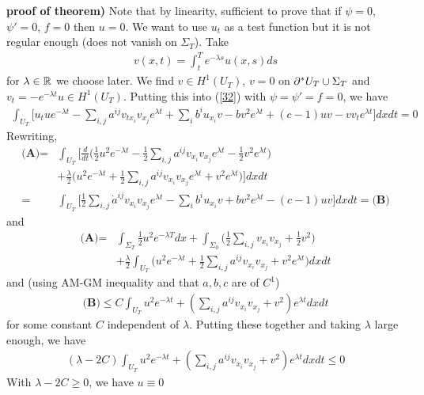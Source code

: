 \documentclass[12pt,a4paper]{report}
\newenvironment{proof}
{\begin{changemargin}{1cm}{0.5cm} 
	}%
	{\end{changemargin}
}
\begin{document}
\begin{proof}
\textbf{proof of theorem)} Note that by linearity, sufficient to prove that if $\psi = 0$, $\psi'=0$, $f=0$ then $u=0$. We want to use $u_t$ as a test function but it is not regular enough (does not vanish on $\Sigma_T$). Take
\begin{align*}
v(x,t) = \int_t^T e^{-\lambda s} u(x,s) ds
\end{align*}
for $\lambda\in \mathbb{R}$ we choose later. We find $v\in H^1(U_T)$, $v=0$ on $\partial^* U_T \cup \Sigma_T$ and $v_t = -e^{-\lambda t} u \in H^1(U_T)$. Putting this into (\ref{32}) with $\psi = \psi' =f=0$, we have
\begin{align*}
\int_{U_T} \Big[ u_t u e^{-\lambda t} - \sum_{i,j} a^{ij} v_{tx_i} v_{x_j} e^{\lambda t} + \sum_{i} b^i u_{x_i} v - bv^2 e^{\lambda t} + (c- 1)uv -   vv_t e^{\lambda t} \Big] dxdt = 0
\end{align*}
Rewriting,
\begin{align*}
\textbf{(A)} =& \int_{U_T} \Big[ \frac{d}{dt} \Big( \frac{1}{2}u^2 e^{-\lambda t} -\frac{1}{2} \sum_{i,j}a^{ij} v_{x_i}v_{x_j} e^{\lambda t} - \frac{1}{2}v^2 e^{\lambda t} \Big) \\
&+ \frac{\lambda}{2} \Big( u^2 e^{-\lambda t} + \frac{1}{2} \sum_{i,j} a^{ij}v_{x_i}v_{x_j} e^{\lambda t} + v^2 e^{\lambda t} \Big) \Big] dxdt \\
=& \int_{U_T} \Big[ \frac{1}{2} \sum_{i,j} \dot{a}^{ij} v_{x_i}v_{x_j} e^{\lambda t} - \sum_{i} b^i u_{x_i} v + bv^2 e^{\lambda t} -(c-1)uv \Big] dxdt = \textbf{(B)}
\end{align*}
and
\begin{align*}
\textbf{(A)} = & \int_{\Sigma_T} \frac{1}{2} u^2 e^{-\lambda T} dx + \int_{\Sigma_0} \Big( \frac{1}{2} \sum_{i,j} v_{x_i} v_{x_j}  + \frac{1}{2} v^2\Big) \\
& + \frac{\lambda}{2} \int_{U_T} \Big( u^2 e^{-\lambda t} + \frac{1}{2} \sum_{i,j} a^{ij} v_{x_i}v_{x_j} + v^2 e^{\lambda t} \Big) dxdt
\end{align*}
and (using AM-GM inequality and that $a,b,c$ are of $C^1$)
\begin{align*}
\textbf{(B)} \leq C \int_{U_T} u^2 e^{-\lambda t} + (\sum_{i,j} a^{ij} v_{x_i} v_{x_j} + v^2)e^{\lambda t} dxdt
\end{align*}
for some constant $C$ independent of $\lambda$. Putting these together and taking $\lambda$ large enough, we have
\begin{align*}
(\lambda -2C) \int_{U_T} u^2 e^{-\lambda t} + (\sum_{i,j} a^{ij}v_{x_i}v_{x_j} + v^2)e^{\lambda t} dxdt \leq 0
\end{align*}
With $\lambda -2C \geq 0$, we have $u\equiv 0$

\eop
\end{proof}
\s
\end{document}
